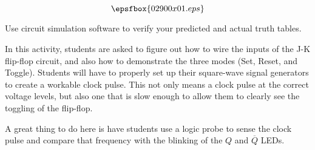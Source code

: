 

$$\epsfbox{02900x01.eps}$$

\vfil \eject






Use circuit simulation software to verify your predicted and actual truth tables.







In this activity, students are asked to figure out how to wire the inputs of the J-K flip-flop circuit, and also how to demonstrate the three modes (Set, Reset, and Toggle).  Students will have to properly set up their square-wave signal generators to create a workable clock pulse.  This not only means a clock pulse at the correct voltage levels, but also one that is slow enough to allow them to clearly see the toggling of the flip-flop.

A great thing to do here is have students use a logic probe to sense the clock pulse and compare that frequency with the blinking of the $Q$ and $\overline{Q}$ LEDs.




